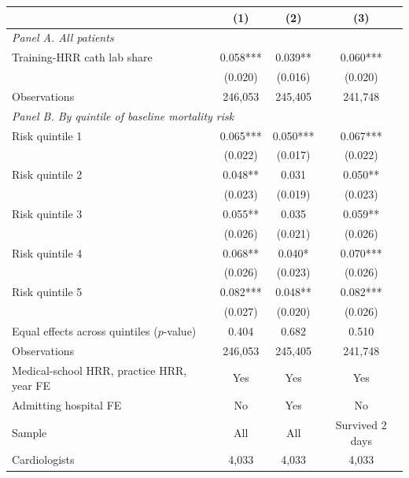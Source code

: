 \begin{tabular}{lccc}
\toprule
 & (1) & (2) & (3) \\
\midrule
\multicolumn{4}{l}{\textit{Panel A. All patients}} \\
Training-HRR cath lab share & 0.058*** & 0.039** & 0.060*** \\
 & (0.020) & (0.016) & (0.020) \\
Observations & 246,053 & 245,405 & 241,748 \\
\midrule
\multicolumn{4}{l}{\textit{Panel B. By quintile of baseline mortality risk}} \\
Risk quintile 1 & 0.065*** & 0.050*** & 0.067*** \\
 & (0.022) & (0.017) & (0.022) \\
Risk quintile 2 & 0.048** & 0.031 & 0.050** \\
 & (0.023) & (0.019) & (0.023) \\
Risk quintile 3 & 0.055** & 0.035 & 0.059** \\
 & (0.026) & (0.021) & (0.026) \\
Risk quintile 4 & 0.068** & 0.040* & 0.070*** \\
 & (0.026) & (0.023) & (0.026) \\
Risk quintile 5 & 0.082*** & 0.048** & 0.082*** \\
 & (0.027) & (0.020) & (0.026) \\
Equal effects across quintiles ($p$-value) & 0.404 & 0.682 & 0.510 \\
Observations & 246,053 & 245,405 & 241,748 \\
\midrule
Medical-school HRR, practice HRR, year FE & Yes & Yes & Yes \\
Admitting hospital FE & No & Yes & No \\
Sample & All & All & Survived 2 days \\
Cardiologists & 4,033 & 4,033 & 4,033 \\
\bottomrule
\end{tabular}

